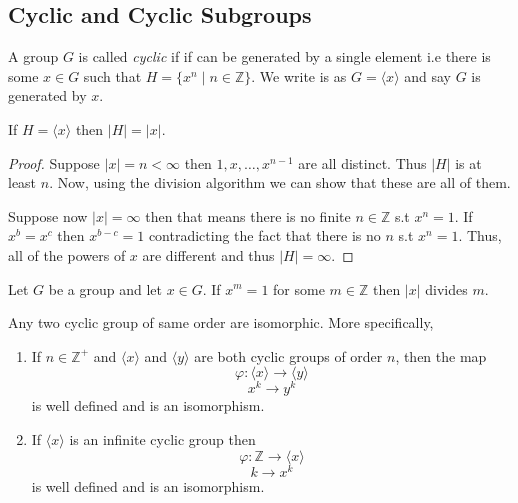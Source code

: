 \subsection{Cyclic and Cyclic Subgroups}

\begin{definition}
    A group $G$ is called \textit{cyclic} if if can be generated by a single element i.e there is some $x \in G$ such that 
    $H= \{x^n \mid n \in \mathbb{Z}\}$. We write is as $G=\langle x \rangle$ and say $G$ is generated by $x$.
\end{definition}


\begin{proposition}
    If $H= \langle x \rangle$ then $|H|=|x|$.
\end{proposition}

\begin{proof}
    Suppose $|x|=n < \infty$ then $1,x,\ldots,x^{n-1}$ are all distinct. Thus $|H|$ is at least $n$. Now, using the division algorithm
    we can show that these are all of them.
    
    Suppose now $|x| = \infty$ then that means there is no finite $n \in \mathbb{Z}$ s.t $x^n = 1$. If $x^b=x^c$ then $x^{b-c}=1$ 
    contradicting the fact that there is no $n$ s.t $x^n=1$. Thus, all of the powers of $x$ are different and thus $|H|=\infty$.
\end{proof}

\begin{proposition}
    Let $G$ be a group and let $x \in G$. If $x^m=1$ for some $m \in \mathbb{Z}$ then $|x|$ divides $m$.
\end{proposition}

\begin{proposition}
    Any two cyclic group of same order are isomorphic. More specifically, 
    \begin{enumerate}
        \item If $n \in \mathbb{Z}^{+}$ and $\langle x \rangle$ and $\langle y \rangle$ are both cyclic groups of order $n$, then the map
                \[ \varphi: \langle x \rangle \to \langle y \rangle \]
                \[ x^k \to y^k \]
            is well defined and is an isomorphism.
        \item If $\langle x \rangle$ is an infinite cyclic group then
                \[\varphi: \mathbb{Z} \to \langle x \rangle\]
                \[k \to x^k\]
            is well defined and is an isomorphism.
    \end{enumerate}
\end{proposition}

